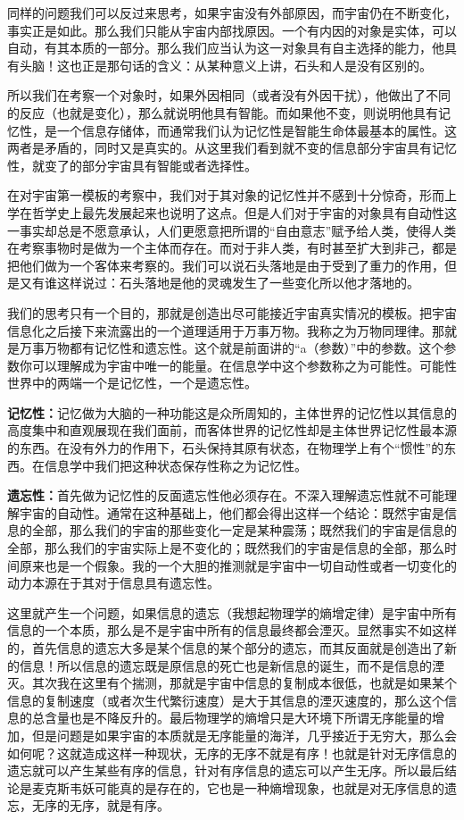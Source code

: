 \documentclass[12pt]{exam}%
\begin{document}
同样的问题我们可以反过来思考，如果宇宙没有外部原因，而宇宙仍在不断变化，事实正是如此。那么我们只能从宇宙内部找原因。一个有内因的对象是实体，可以自动，有其本质的一部分。那么我们应当认为这一对象具有自主选择的能力，他具有头脑！这也正是那句话的含义：从某种意义上讲，石头和人是没有区别的。

所以我们在考察一个对象时，如果外因相同（或者没有外因干扰），他做出了不同的反应（也就是变化），那么就说明他具有智能。而如果他不变，则说明他具有记忆性，是一个信息存储体，而通常我们认为记忆性是智能生命体最基本的属性。这两者是矛盾的，同时又是真实的。从这里我们看到就不变的信息部分宇宙具有记忆性，就变了的部分宇宙具有智能或者选择性。

在对宇宙第一模板的考察中，我们对于其对象的记忆性并不感到十分惊奇，形而上学在哲学史上最先发展起来也说明了这点。但是人们对于宇宙的对象具有自动性这一事实却总是不愿意承认，人们更愿意把所谓的“自由意志”赋予给人类，使得人类在考察事物时是做为一个主体而存在。而对于非人类，有时甚至扩大到非己，都是把他们做为一个客体来考察的。我们可以说石头落地是由于受到了重力的作用，但是又有谁这样说过：石头落地是他的灵魂发生了一些变化所以他才落地的。

我们的思考只有一个目的，那就是创造出尽可能接近宇宙真实情况的模板。把宇宙信息化之后接下来流露出的一个道理适用于万事万物。我称之为万物同理律。那就是万事万物都有记忆性和遗忘性。这个就是前面讲的“a（参数）”中的参数。这个参数你可以理解成为宇宙中唯一的能量。在信息学中这个参数称之为可能性。可能性世界中的两端一个是记忆性，一个是遗忘性。

\textbf{记忆性：}记忆做为大脑的一种功能这是众所周知的，主体世界的记忆性以其信息的高度集中和直观展现在我们面前，而客体世界的记忆性却是主体世界记忆性最本源的东西。在没有外力的作用下，石头保持其原有状态，在物理学上有个“惯性”的东西。在信息学中我们把这种状态保存性称之为记忆性。

\textbf{遗忘性：}首先做为记忆性的反面遗忘性他必须存在。不深入理解遗忘性就不可能理解宇宙的自动性。通常在这种基础上，他们都会得出这样一个结论：既然宇宙是信息的全部，那么我们的宇宙的那些变化一定是某种震荡；既然我们的宇宙是信息的全部，那么我们的宇宙实际上是不变化的；既然我们的宇宙是信息的全部，那么时间原来也是一个假象。我的一个大胆的推测就是宇宙中一切自动性或者一切变化的动力本源在于其对于信息具有遗忘性。

这里就产生一个问题，如果信息的遗忘（我想起物理学的熵增定律）是宇宙中所有信息的一个本质，那么是不是宇宙中所有的信息最终都会湮灭。显然事实不如这样的，首先信息的遗忘大多是某个信息的某个部分的遗忘，而其反面就是创造出了新的信息！所以信息的遗忘既是原信息的死亡也是新信息的诞生，而不是信息的湮灭。其次我在这里有个揣测，那就是宇宙中信息的复制成本很低，也就是如果某个信息的复制速度（或者次生代繁衍速度）是大于其信息的湮灭速度的，那么这个信息的总含量也是不降反升的。最后物理学的熵增只是大环境下所谓无序能量的增加，但是问题是如果宇宙的本质就是无序能量的海洋，几乎接近于无穷大，那么会如何呢？这就造成这样一种现状，无序的无序不就是有序！也就是针对无序信息的遗忘就可以产生某些有序的信息，针对有序信息的遗忘可以产生无序。所以最后结论是麦克斯韦妖可能真的是存在的，它也是一种熵增现象，也就是对无序信息的遗忘，无序的无序，就是有序。
\end{document}

